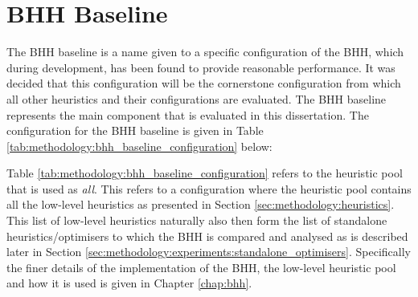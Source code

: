 \section{BHH Baseline}
\label{sec:methodology:baseline_bhh}

The \ac{BHH} baseline is a name given to a specific configuration of the \ac{BHH}, which during development, has been found to provide reasonable performance. It was decided that this configuration will be the cornerstone configuration from which all other heuristics and their configurations are evaluated. The \ac{BHH} baseline represents the main component that is evaluated in this dissertation. The configuration for the \ac{BHH} baseline is given in Table \ref{tab:methodology:bhh_baseline_configuration} below:

\begin{table}[htbp]
  \centering
    \caption{BHH baseline configurations}
    \label{tab:methodology:bhh_baseline_configuration}%
    \par\bigskip
\end{table}%

Table \ref{tab:methodology:bhh_baseline_configuration} refers to the heuristic pool that is used as \textit{all}. This refers to a configuration where the heuristic pool contains all the low-level heuristics as presented in Section \ref{sec:methodology:heuristics}. This list of low-level heuristics naturally also then form the list of standalone heuristics/optimisers to which the \ac{BHH} is compared and analysed as is described later in  Section \ref{sec:methodology:experiments:standalone_optimisers}. Specifically the finer details of the implementation of the \ac{BHH}, the low-level heuristic pool and how it is used is given in Chapter \ref{chap:bhh}. 


